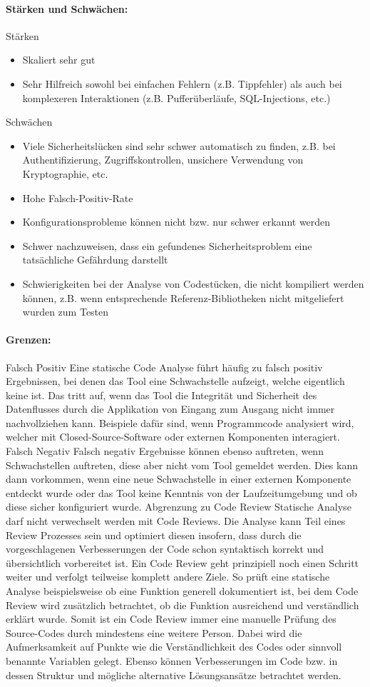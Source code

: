 \paragraph{Stärken und Schwächen:}
Stärken
\begin{itemize}
\item Skaliert sehr gut
\item Sehr Hilfreich sowohl bei einfachen Fehlern (z.B. Tippfehler) als auch bei komplexeren Interaktionen (z.B. Pufferüberläufe, SQL-Injections, etc.)
\end{itemize}
Schwächen
\begin{itemize}
\item Viele Sicherheitslücken sind sehr schwer automatisch zu finden, z.B. bei Authentifizierung, Zugriffskontrollen, unsichere Verwendung von Kryptographie, etc.
\item Hohe Falsch-Positiv-Rate
\item Konfigurationsprobleme können nicht bzw. nur schwer erkannt werden
\item Schwer nachzuweisen, dass ein gefundenes Sicherheitsproblem eine tatsächliche Gefährdung darstellt
\item Schwierigkeiten bei der Analyse von Codestücken, die nicht kompiliert werden können, z.B. wenn entsprechende Referenz-Bibliotheken nicht mitgeliefert wurden zum Testen
\end{itemize}
\paragraph{Grenzen:}
Falsch Positiv
Eine statische Code Analyse führt häufig zu falsch positiv Ergebnissen, bei denen das Tool eine Schwachstelle aufzeigt, welche eigentlich keine ist. Das tritt auf, wenn das Tool die Integrität und Sicherheit des Datenflusses durch die Applikation von Eingang zum Ausgang nicht immer nachvollziehen kann. Beispiele dafür sind, wenn Programmcode analysiert wird, welcher mit Closed-Source-Software oder externen Komponenten interagiert.
Falsch Negativ
Falsch negativ Ergebnisse können ebenso auftreten, wenn Schwachstellen auftreten, diese aber nicht vom Tool gemeldet werden. Dies kann dann vorkommen, wenn eine neue Schwachstelle in einer externen Komponente entdeckt wurde oder das Tool keine Kenntnis von der Laufzeitumgebung und ob diese sicher konfiguriert wurde.
Abgrenzung zu Code Review
Statische Analyse darf nicht verwechselt werden mit Code Reviews. Die Analyse kann Teil eines Review Prozesses sein und optimiert diesen insofern, dass durch die vorgeschlagenen Verbesserungen der Code schon syntaktisch korrekt und übersichtlich vorbereitet ist.
Ein Code Review geht prinzipiell noch einen Schritt weiter und verfolgt teilweise komplett andere Ziele. So prüft eine statische Analyse beispielsweise ob eine Funktion generell dokumentiert ist, bei dem Code Review wird zusätzlich betrachtet, ob die Funktion ausreichend und verständlich erklärt wurde.
Somit ist ein Code Review immer eine manuelle Prüfung des Source-Codes durch mindestens eine weitere Person. Dabei wird die Aufmerksamkeit auf Punkte wie die Verständlichkeit des Codes oder sinnvoll benannte Variablen gelegt. Ebenso können Verbesserungen im Code bzw. in dessen Struktur und mögliche alternative Lösungsansätze betrachtet werden.
